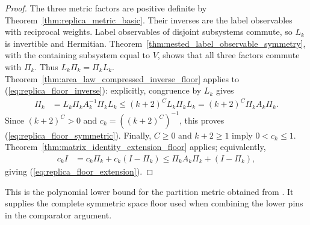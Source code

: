 \begin{proof}
    The three metric factors are positive definite by
    Theorem~\ref{thm:replica_metric_basic}. Their inverses are the label
    observables with reciprocal weights. Label observables of disjoint
    subsystems commute, so $L_k$ is invertible and Hermitian.
    Theorem~\ref{thm:nested_label_observable_symmetry}, with the containing
    subsystem equal to $V$, shows that all three factors commute with
    $\Pi_k$. Thus $L_k\Pi_k=\Pi_kL_k$.
    Theorem~\ref{thm:area_law_compressed_inverse_floor} applies to
    (\ref{eq:replica_floor_inverse}): explicitly, congruence by $L_k$ gives
    \begin{align}
        \Pi_k
         & =L_k\Pi_kA_k^{-1}\Pi_kL_k
        \le(k+2)^C L_k\Pi_kL_k
        =(k+2)^C\Pi_kA_k\Pi_k.
    \end{align}
    Since $(k+2)^C>0$ and $c_k=((k+2)^C)^{-1}$, this proves
    (\ref{eq:replica_floor_symmetric}). Finally, $C\ge0$ and $k+2\ge1$
    imply $0<c_k\le1$. Theorem~\ref{thm:matrix_identity_extension_floor}
    applies; equivalently,
    \begin{align}
        c_kI
         & =c_k\Pi_k+c_k(I-\Pi_k)
        \le\Pi_kA_k\Pi_k+(I-\Pi_k),
    \end{align}
    giving (\ref{eq:replica_floor_extension}).
\end{proof}

This is the polynomial lower bound for the partition metric obtained from
\cite[Lemmas~6.1--6.2]{OpenAI2026AreaLaw}. It supplies the complete symmetric
space floor used when combining the lower pins in the comparator argument.
